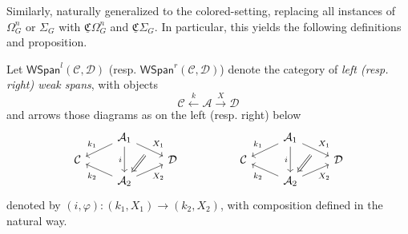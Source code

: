 \documentclass[a4paper,10pt
]{article}%
\renewcommand{\phi}{\varphi}
\newcommand{\UC}{\underline{\mathfrak C}}
\renewcommand{\1}{\ensuremath{\mathbb{id}}}
\begin{document}
Similarly, \cite[Prop 3.47, 3.90, 4.12, 4.15, 4.26, 4.28, 4.30]{BP17} naturally generalized to the colored-setting,
replacing all instances of $\Omega_G^n$ or $\Sigma_G$ with $\UC\Omega_G^n$ and $\UC\Sigma_G$.
In particular, this yields the following definitions and proposition.
\begin{definition}[{cf. \cite[Defn 4.3]{BP17}}]
      Let $\mathsf{WSpan}^l(\mathcal C, \mathcal D)$ (resp. $\mathsf{WSpan}^r(\mathcal C, \mathcal D)$)
      denote the category of \textit{left (resp. right) weak spans}, with objects
      \begin{equation}
            \mathcal C \xleftarrow{k} \mathcal A \xrightarrow{X} \mathcal D
      \end{equation}
      and arrows those diagrams as on the left (resp. right) below
      \begin{equation}
            \begin{tikzcd}[row sep = tiny]
                  & \mathcal A_1 \arrow[dr, "X_1", ""'{name=U}] \arrow[dl, "k_1"'] \arrow[dd, "i"']
                  &
                  &&
                  &
                  \mathcal A_1 \arrow[dr, "X_1", ""'{name=A}] \arrow[dl, "k_1"'] \arrow[dd, "i"']
                  \\
                  \mathcal C
                  &&
                  \mathcal D
                  &&
                  \mathcal C
                  &&
                  \mathcal D
                  \\
                  & |[alias=V]| \mathcal A_2 \arrow[ur, "X_2"'] \arrow[ul, "k_2"]
                  &
                  &&
                  &
                  |[alias=B]| \mathcal A_2 \arrow[ur, "X_2"'] \arrow[ul, "k_2"]
                  \arrow[Rightarrow, from = U, to = V]
                  \arrow[Rightarrow, from = A, to = B]
            \end{tikzcd}
      \end{equation}
      denoted by $(i,\phi): (k_1,X_1) \to (k_2,X_2)$, with composition defined in the natural way.      
\end{definition}

\end{document}

